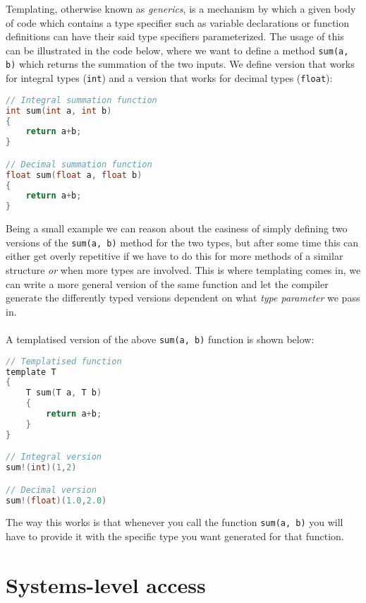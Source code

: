 Templating, otherwise known as \emph{generics}, is a mechanism by
which a given body of code which contains a type specifier such as
variable declarations or function definitions can have their said
type specifiers parameterized. The usage of this can be illustrated
in the code below, where we want to define a method \texttt{sum(a, b)}
which returns the summation of the two inputs. We define version that
works for integral types (\texttt{int}) and a version that works
for decimal types (\texttt{float}):\\
\begin{lstlisting}[language=C]
// Integral summation function
int sum(int a, int b)
{
	return a+b;
}

// Decimal summation function
float sum(float a, float b)
{
	return a+b;
}
\end{lstlisting}Being a small example we can reason about the easiness of simply defining
two versions of the \texttt{sum(a, b)} method for the two types,
but after some time this can either get overly repetitive if we have
to do this for more methods of a similar structure \emph{or }when
more types are involved. This is where templating comes in, we can
write a more general version of the same function and let the compiler
generate the differently typed versions dependent on what \emph{type
parameter} we pass in.\\
\\
A templatised version of the above \texttt{sum(a, b)} function is
shown below:\\
\begin{lstlisting}[language=C]
// Templatised function
template T
{
	T sum(T a, T b)
	{
		return a+b;
	}
}

// Integral version
sum!(int)(1,2)

// Decimal version
sum!(float)(1.0,2.0)
\end{lstlisting}The way this works is that whenever you call the function \texttt{sum(a, b)}
you will have to provide it with the specific type you want generated
for that function.

\section{Systems-level access}

